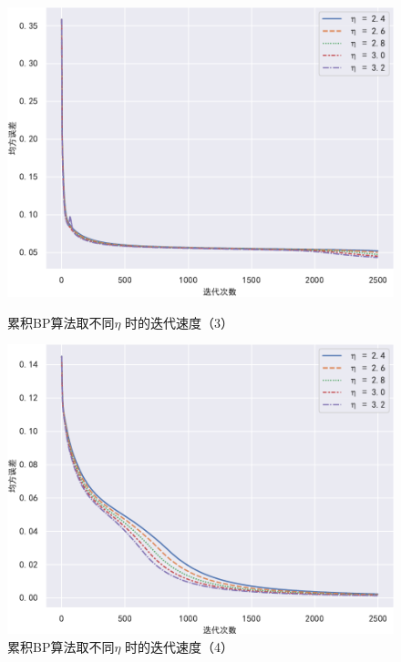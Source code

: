 \documentclass{ctexart}
\begin{document}
\begin{figure}[!htb]
		\begin{minipage}{0.49\linewidth}
			\centering
			\includegraphics[width=\textwidth]{../image/累积BP抖动3.pdf}
			\caption{累积BP算法取不同$\eta$ 时的迭代速度（3）}
			\label{累积3}%
		\end{minipage}
		\begin{minipage}{0.49\linewidth}
			\centering
			\includegraphics[width=\textwidth]{../image/累积BP抖动4.pdf}
			\caption{累积BP算法取不同$\eta$ 时的迭代速度（4）}
			\label{累积4}%
		\end{minipage}
	\end{figure}
	
\end{document}
